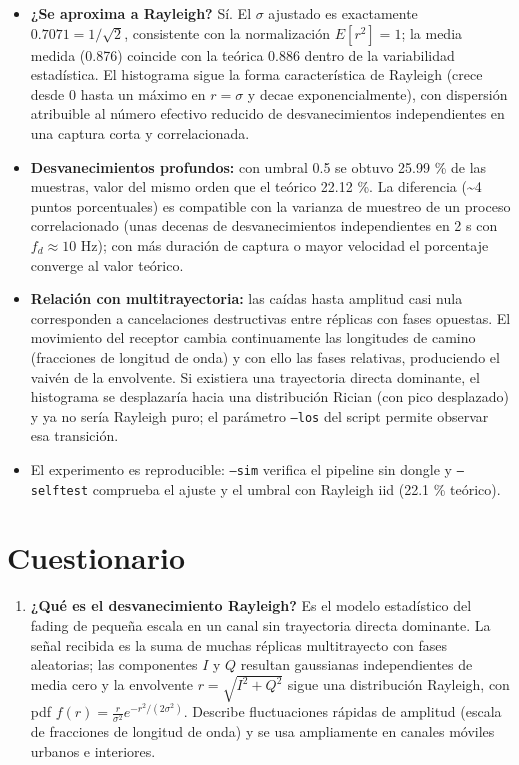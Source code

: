\documentclass[11pt,a4paper]{article}
\begin{document}
\begin{itemize}
  \item \textbf{¿Se aproxima a Rayleigh?} Sí. El $\sigma$ ajustado es exactamente $0.7071 = 1/\sqrt{2}$, consistente con la normalización $E[r^2]=1$; la media medida (0.876) coincide con la teórica $0.886$ dentro de la variabilidad estadística. El histograma sigue la forma característica de Rayleigh (crece desde 0 hasta un máximo en $r=\sigma$ y decae exponencialmente), con dispersión atribuible al número efectivo reducido de desvanecimientos independientes en una captura corta y correlacionada.
  \item \textbf{Desvanecimientos profundos:} con umbral 0.5 se obtuvo 25.99 \% de las muestras, valor del mismo orden que el teórico 22.12 \%. La diferencia (\textasciitilde{}4 puntos porcentuales) es compatible con la varianza de muestreo de un proceso correlacionado (unas decenas de desvanecimientos independientes en 2 s con $f_d \approx 10$ Hz); con más duración de captura o mayor velocidad el porcentaje converge al valor teórico.
  \item \textbf{Relación con multitrayectoria:} las caídas hasta amplitud casi nula corresponden a cancelaciones destructivas entre réplicas con fases opuestas. El movimiento del receptor cambia continuamente las longitudes de camino (fracciones de longitud de onda) y con ello las fases relativas, produciendo el vaivén de la envolvente. Si existiera una trayectoria directa dominante, el histograma se desplazaría hacia una distribución Rician (con pico desplazado) y ya no sería Rayleigh puro; el parámetro \texttt{--los} del script permite observar esa transición.
  \item El experimento es reproducible: \texttt{--sim} verifica el pipeline sin dongle y \texttt{--selftest} comprueba el ajuste y el umbral con Rayleigh iid (22.1 \% teórico).
\end{itemize}

\section{Cuestionario}

\begin{enumerate}
  \item \textbf{¿Qué es el desvanecimiento Rayleigh?} Es el modelo estadístico del fading de pequeña escala en un canal sin trayectoria directa dominante. La señal recibida es la suma de muchas réplicas multitrayecto con fases aleatorias; las componentes $I$ y $Q$ resultan gaussianas independientes de media cero y la envolvente $r=\sqrt{I^2+Q^2}$ sigue una distribución Rayleigh, con pdf $f(r)=\frac{r}{\sigma^2}e^{-r^2/(2\sigma^2)}$. Describe fluctuaciones rápidas de amplitud (escala de fracciones de longitud de onda) y se usa ampliamente en canales móviles urbanos e interiores.
\end{enumerate}
\end{document}
